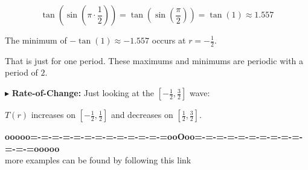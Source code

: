 \documentclass{ximera}
\begin{document}
\[   \tan\left(\sin\left(\pi \cdot \frac{1}{2}\right)\right)  =   \tan\left(\sin\left(\frac{\pi}{2}\right)\right)  = \tan(1)  \approx 1.557  \]


The minimum of $-\tan(1) \approx -1.557$ occurs at $r = -\frac{1}{2}$.


That is just for one period. These maximums and minimums are periodic with a period of $2$.






$\blacktriangleright$ \textbf{Rate-of-Change:}  Just looking at the $\left[ -\frac{1}{2}, \frac{3}{2} \right]$ wave:

$T(r)$ increases on $\left[ -\frac{1}{2}, \frac{1}{2} \right]$ and decreases on $\left[\frac{1}{2}, \frac{3}{2} \right]$.












\begin{center}
\textbf{\textcolor{green!50!black}{ooooo=-=-=-=-=-=-=-=-=-=-=-=-=ooOoo=-=-=-=-=-=-=-=-=-=-=-=-=ooooo}} \\

more examples can be found by following this link\\ 

\end{center}
\end{document}
